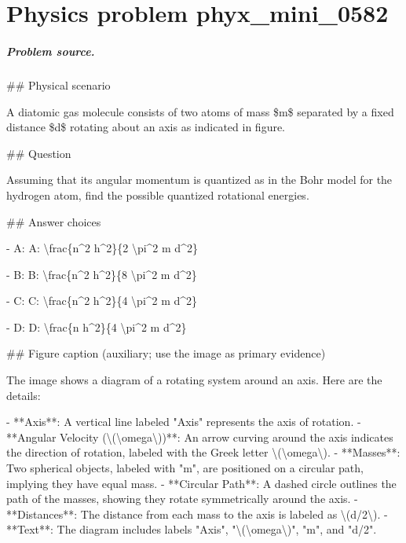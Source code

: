 
\chapter{Physics problem phyx\_mini\_0582}
\label{ch:PhyXMiniProblems_problem_phyx_mini_0582}

\paragraph{Problem source.}
\#\# Physical scenario

A diatomic gas molecule consists of two atoms of mass \$m\$ separated by a fixed distance \$d\$ rotating about an axis as indicated in figure.

\#\# Question

Assuming that its angular momentum is quantized as in the Bohr model for the hydrogen atom, find the possible quantized rotational energies.

\#\# Answer choices

- A: A: \textbackslash{}frac\{n\textasciicircum{}2 h\textasciicircum{}2\}\{2 \textbackslash{}pi\textasciicircum{}2 m d\textasciicircum{}2\}

- B: B: \textbackslash{}frac\{n\textasciicircum{}2 h\textasciicircum{}2\}\{8 \textbackslash{}pi\textasciicircum{}2 m d\textasciicircum{}2\}

- C: C: \textbackslash{}frac\{n\textasciicircum{}2 h\textasciicircum{}2\}\{4 \textbackslash{}pi\textasciicircum{}2 m d\textasciicircum{}2\}

- D: D: \textbackslash{}frac\{n h\textasciicircum{}2\}\{4 \textbackslash{}pi\textasciicircum{}2 m d\textasciicircum{}2\}

\#\# Figure caption (auxiliary; use the image as primary evidence)

The image shows a diagram of a rotating system around an axis. Here are the details:

- **Axis**: A vertical line labeled "Axis" represents the axis of rotation.
- **Angular Velocity (\textbackslash{}(\textbackslash{}omega\textbackslash{}))**: An arrow curving around the axis indicates the direction of rotation, labeled with the Greek letter \textbackslash{}(\textbackslash{}omega\textbackslash{}).
- **Masses**: Two spherical objects, labeled with "m", are positioned on a circular path, implying they have equal mass.
- **Circular Path**: A dashed circle outlines the path of the masses, showing they rotate symmetrically around the axis.
- **Distances**: The distance from each mass to the axis is labeled as \textbackslash{}(d/2\textbackslash{}).
- **Text**: The diagram includes labels "Axis", "\textbackslash{}(\textbackslash{}omega\textbackslash{})", "m", and "d/2".

